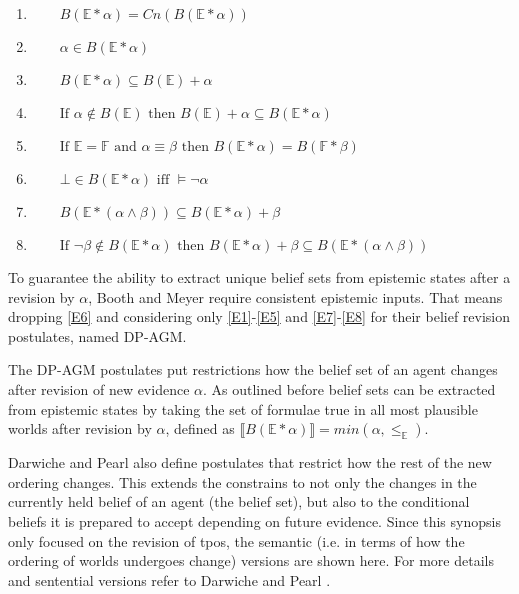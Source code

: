 \documentclass[english, 12pt]{scrartcl}
\theoremstyle{definition}
\theoremstyle{definition}
\theoremstyle{definition}
\newcommand{\modelsOf}[1]{\llbracket #1 \rrbracket}
\begin{document}
\begin{enumerate}[wide=0pt, widest=99,leftmargin=\parindent,label = ($\mathbb{E}\!*\!\arabic*$)]
    \item\label{E1} $\qquad B(\mathbb{E}\ast\alpha) = Cn(B(\mathbb{E}\ast\alpha))$
    \item\label{E2} $\qquad \alpha \in B(\mathbb{E}\ast\alpha)$
    \item\label{E3} $\qquad B(\mathbb{E}\ast\alpha)  \subseteq B(\mathbb{E})+\alpha$
    \item\label{E4} $\qquad \textrm{If } \alpha \notin B(\mathbb{E}) \textrm{ then } B(\mathbb{E}) + \alpha \subseteq B(\mathbb{E} \ast \alpha)$
    \item\label{E5} $\qquad \textrm{If } \mathbb{E} = \mathbb{F} \textrm{ and } \alpha \equiv \beta \textrm{ then } B(\mathbb{E} \ast \alpha) = B(\mathbb{F} \ast \beta)$
    \item\label{E6} $\qquad \bot \in B(\mathbb{E} \ast \alpha) \textrm{ iff } \models \neg \alpha$
    \item\label{E7} $\qquad B(\mathbb{E} \ast (\alpha \wedge \beta)) \subseteq B(\mathbb{E} \ast \alpha) + \beta$
    \item\label{E8} $\qquad \textrm{If } \neg \beta \notin B(\mathbb{E} \ast \alpha) \textrm{ then } B(\mathbb{E} \ast \alpha) + \beta \subseteq B(\mathbb{E} \ast (\alpha \wedge \beta))$
\end{enumerate}

To guarantee the ability to extract unique belief sets from epistemic states after a revision by $\alpha$, Booth and Meyer \cite{Booth2011} require consistent epistemic inputs. That means dropping \ref{E6} and considering only \ref{E1}-\ref{E5} and \ref{E7}-\ref{E8} for their belief revision postulates, named DP-AGM.

The DP-AGM postulates put restrictions how the belief set of an agent changes after revision of new evidence $\alpha$. As outlined before belief sets can be extracted from epistemic states by taking the set of formulae true in all most plausible worlds after revision by $\alpha$, defined as $\modelsOf{B(\mathbb{E}\ast\alpha)} = min(\alpha, \leq_{\mathbb{E}})$.

Darwiche and Pearl also define postulates that restrict how the rest of the new ordering changes. This extends the constrains to not only the changes in the currently held belief of an agent (the belief set), but also to the conditional beliefs it is prepared to accept depending on future evidence. Since this synopsis only focused on the revision of tpos, the semantic (i.e. in terms of how the ordering of worlds undergoes change) versions are shown here. For more details and sentential versions refer to Darwiche and Pearl \cite{Darwiche1997}.
\end{document}
